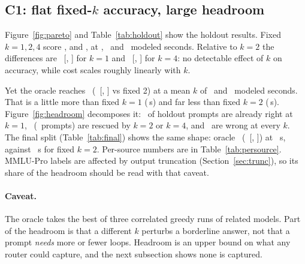\documentclass[11pt]{article}
\makeatletter
\def\sg@aux#1#2\relax{\if#1-$-$#2\else\if#1+{+}#2\else{+}#1#2\fi\fi}
\newcommand{\sg}[1]{\expandafter\sg@aux#1\relax}
\makeatother
\begin{document}
\subsection{C1: flat fixed-\texorpdfstring{$k$}{k} accuracy, large headroom}
\label{sec:c1}
Figure~\ref{fig:pareto} and Table~\ref{tab:holdout} show the holdout results. Fixed $k{=}1,2,4$ score \HoldoutFixedOneAcc, \HoldoutFixedTwoAcc{} and \HoldoutFixedFourAcc, at \HoldoutFixedOneSec, \HoldoutFixedTwoSec\ and \HoldoutFixedFourSec\ modeled seconds. Relative to $k{=}2$ the differences are \sg{\HoldoutFixedOneDelta}\ [\sg{\HoldoutFixedOneLo}, \sg{\HoldoutFixedOneHi}] for $k{=}1$ and \sg{\HoldoutFixedFourDelta}\ [\sg{\HoldoutFixedFourLo}, \sg{\HoldoutFixedFourHi}] for $k{=}4$: no detectable effect of $k$ on accuracy, while cost scales roughly linearly with $k$.

Yet the oracle reaches \HoldoutOracleAcc\ (\sg{\HoldoutOracleDelta}\ [\sg{\HoldoutOracleLo}, \sg{\HoldoutOracleHi}] vs fixed 2) at a mean $k$ of \HoldoutOracleMeanK\ and \HoldoutOracleSec\ modeled seconds. That is a little more than fixed $k{=}1$ (\HoldoutFixedOneSec\,s) and far less than fixed $k{=}2$ (\HoldoutFixedTwoSec\,s). Figure~\ref{fig:headroom} decomposes it: \HoldoutOracleAlready\ of holdout prompts are already right at $k{=}1$, \HoldoutOracleRescued\ (\HoldoutOracleRescuedN\ prompts) are rescued by $k{=}2$ or $k{=}4$, and \HoldoutOracleNever\ are wrong at every $k$. The final split (Table~\ref{tab:final}) shows the same shape: oracle \FinalOracleAcc\ (\sg{\FinalOracleDelta}\ [\sg{\FinalOracleLo}, \sg{\FinalOracleHi}]) at \FinalOracleSec\ s, against \FinalFixedTwoSec\ s for fixed $k{=}2$. Per-source numbers are in Table~\ref{tab:persource}. MMLU-Pro labels are affected by output truncation (Section~\ref{sec:trunc}), so its share of the headroom should be read with that caveat.

\paragraph{Caveat.} The oracle takes the best of three correlated greedy runs of related models. Part of the headroom is that a different $k$ perturbs a borderline answer, not that a prompt \emph{needs} more or fewer loops. Headroom is an upper bound on what any router could capture, and the next subsection shows none is captured.
\end{document}

